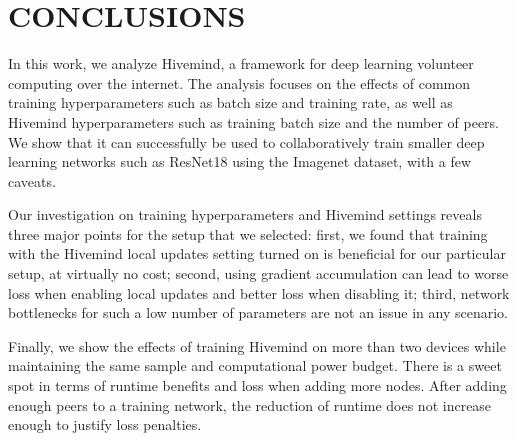 \chapter{CONCLUSIONS}\label{chapter:conclusions}
In this work, we analyze Hivemind, a framework for deep learning volunteer computing over the internet.
The analysis focuses on the effects of common training hyperparameters such as batch size and training rate, as well as Hivemind hyperparameters such as training batch size and the number of peers.
We show that it can successfully be used to collaboratively train smaller deep learning networks such as ResNet18 using the Imagenet dataset, with a few caveats.

Our investigation on training hyperparameters and Hivemind settings reveals three major points for the setup that we selected:
first, we found that training with the Hivemind local updates setting turned on is beneficial for our particular setup, at virtually no cost;
second, using gradient accumulation can lead to worse loss when enabling local updates and better loss when disabling it;
third, network bottlenecks for such a low number of parameters are not an issue in any scenario.

Finally, we show the effects of training Hivemind on more than two devices while maintaining the same sample and computational power budget.
There is a sweet spot in terms of runtime benefits and loss when adding more nodes.
After adding enough peers to a training network, the reduction of runtime does not increase enough to justify loss penalties.
